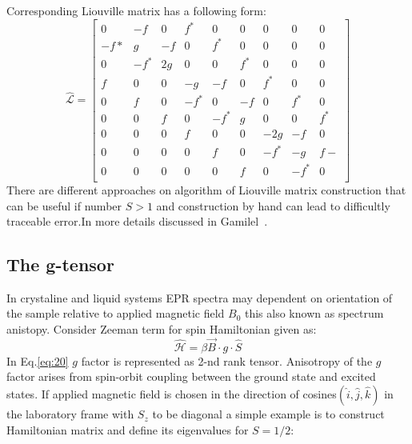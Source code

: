 Corresponding Liouville matrix has a following form: 
\begin{equation}\label{spinoneliv}
\hat{\mathcal{L}} = \begin{bmatrix}
       0 & -f & 0 & f^* &0 & 0 & 0 & 0 & 0         \\[0.3em]
       -f* & g  & -f   & 0 &f^* & 0  & 0   & 0 & 0         \\[0.3em]
       0 & -f^*  & 2g   & 0 &0 & f^*  & 0   & 0 & 0         \\[0.3em]
       f & 0  & 0   & -g &-f & 0  & f^*   & 0 & 0         \\[0.3em]
       0 & f  & 0   & -f^* &0 & -f  & 0   & f^* & 0         \\[0.3em]
       0 & 0  & f   & 0 &-f^* & g  & 0   & 0 & f^*         \\[0.3em]
       0 & 0  & 0   & f &0 & 0  & -2g   & -f & 0         \\[0.3em]
       0 & 0  & 0   & 0 &f & 0  & -f^*   & -g & f-         \\[0.3em]
       0 & 0  & 0   & 0 &0 & f  & 0   & -f^* & 0         \\[0.3em]
     \end{bmatrix}
\end{equation}
There are different approaches on algorithm of Liouville matrix construction that can be useful if number $S>1$ and construction by hand can lead to difficultly traceable error.In more details  discussed in Gamilel~\cite{gam}.   
\subsection{The g-tensor}\label{gtensorsection}
In crystaline and liquid systems EPR spectra may dependent on orientation of the sample relative to applied magnetic field $B_0$ this also known as spectrum anistopy. Consider Zeeman term for spin Hamiltonian given as: 
\begin{equation}\label{eq:20}
\mathcal{\hat{H}}=\beta \vec{B}\cdot g \cdot \hat{S}
\end{equation} 
In Eq.\ref{eq:20} $g$ factor is represented as 2-nd rank tensor. Anisotropy of the $g$ factor arises from spin-orbit coupling between the ground state and excited states. If applied magnetic field is chosen in the direction of cosines$(\hat{i},\hat{j},\hat{k})$ in the laboratory frame with $S_z$ to be diagonal a simple example is to construct Hamiltonian matrix and define its eigenvalues for $S=1/2$:

